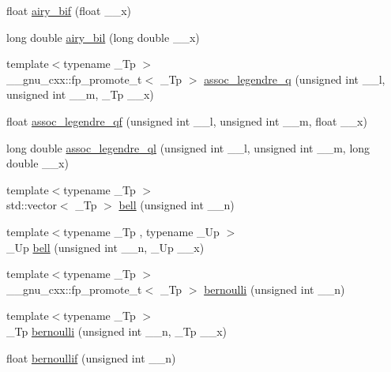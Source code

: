 \begin{DoxyCompactItemize}
\item 
float \hyperlink{group__gnu__math__spec__func_ga2ade465827bdba7370abbcce78e54912}{airy\+\_\+bif} (float \+\_\+\+\_\+x)
\item 
long double \hyperlink{group__gnu__math__spec__func_ga59240b3f40177e5187f3f194f624f0f8}{airy\+\_\+bil} (long double \+\_\+\+\_\+x)
\item 
{\footnotesize template$<$typename \+\_\+\+Tp $>$ }\\\+\_\+\+\_\+gnu\+\_\+cxx\+::fp\+\_\+promote\+\_\+t$<$ \+\_\+\+Tp $>$ \hyperlink{group__gnu__math__spec__func_ga96a1223727fa71ffbf520a98ac3dc885}{assoc\+\_\+legendre\+\_\+q} (unsigned int \+\_\+\+\_\+l, unsigned int \+\_\+\+\_\+m, \+\_\+\+Tp \+\_\+\+\_\+x)
\item 
float \hyperlink{group__gnu__math__spec__func_ga61d651dc8b3c42fe47a02b36e95f72c0}{assoc\+\_\+legendre\+\_\+qf} (unsigned int \+\_\+\+\_\+l, unsigned int \+\_\+\+\_\+m, float \+\_\+\+\_\+x)
\item 
long double \hyperlink{group__gnu__math__spec__func_ga07a9e571759c6d24e96da8cc8268f91e}{assoc\+\_\+legendre\+\_\+ql} (unsigned int \+\_\+\+\_\+l, unsigned int \+\_\+\+\_\+m, long double \+\_\+\+\_\+x)
\item 
{\footnotesize template$<$typename \+\_\+\+Tp $>$ }\\std\+::vector$<$ \+\_\+\+Tp $>$ \hyperlink{group__gnu__math__spec__func_gac07286d722248a7f3c65a13b49b1fef5}{bell} (unsigned int \+\_\+\+\_\+n)
\item 
{\footnotesize template$<$typename \+\_\+\+Tp , typename \+\_\+\+Up $>$ }\\\+\_\+\+Up \hyperlink{group__gnu__math__spec__func_ga1e87244cb33a10de204856cafb19046f}{bell} (unsigned int \+\_\+\+\_\+n, \+\_\+\+Up \+\_\+\+\_\+x)
\item 
{\footnotesize template$<$typename \+\_\+\+Tp $>$ }\\\+\_\+\+\_\+gnu\+\_\+cxx\+::fp\+\_\+promote\+\_\+t$<$ \+\_\+\+Tp $>$ \hyperlink{group__gnu__math__spec__func_gad339f0011df1967ec6c9e55bd1547bf4}{bernoulli} (unsigned int \+\_\+\+\_\+n)
\item 
{\footnotesize template$<$typename \+\_\+\+Tp $>$ }\\\+\_\+\+Tp \hyperlink{group__gnu__math__spec__func_ga140e17e038ab0e3875c1b3fad09bc991}{bernoulli} (unsigned int \+\_\+\+\_\+n, \+\_\+\+Tp \+\_\+\+\_\+x)
\item 
float \hyperlink{group__gnu__math__spec__func_gabcd77f012ae74989c4bb9ca61978481d}{bernoullif} (unsigned int \+\_\+\+\_\+n)

\end{DoxyCompactItemize}
